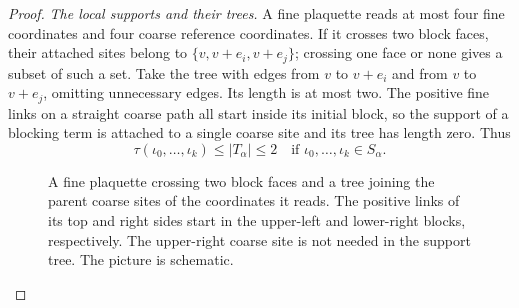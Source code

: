 \documentclass[10pt,reqno]{amsart}
\theoremstyle{definition}
\theoremstyle{remark}
\numberwithin{equation}{section}
\numberwithin{figure}{section}
\begin{document}
\begin{proof}
\emph{The local supports and their trees.} A fine plaquette reads
at most four fine coordinates and four coarse reference coordinates.
If it crosses two block faces, their attached sites belong to
$\{v,v+e_i,v+e_j\}$; crossing one face or none gives a subset of
such a set. Take the tree with edges from $v$ to $v+e_i$ and from
$v$ to $v+e_j$, omitting unnecessary edges. Its length is at most
two. The positive fine links on a straight coarse path all start
inside its initial block, so the support of a blocking term is
attached to a single coarse site and its tree has length zero.
Thus
\begin{equation}\label{eq:local-support-tree-bound}
\tau(\iota_0,\ldots,\iota_k)\le|T_\alpha|\le2
\quad\text{if }\iota_0,\ldots,\iota_k\in S_\alpha.
\end{equation}

\begin{figure}[htbp]
\centering
{}
\caption{A fine plaquette crossing two block faces and a tree joining
the parent coarse sites of the coordinates it reads. The positive
links of its top and right sides start in the upper-left and
lower-right blocks, respectively. The upper-right coarse site is
not needed in the support tree. The picture is schematic.}
\label{fig:local-analytic-support-tree}
\end{figure}


\end{proof}
\end{document}
